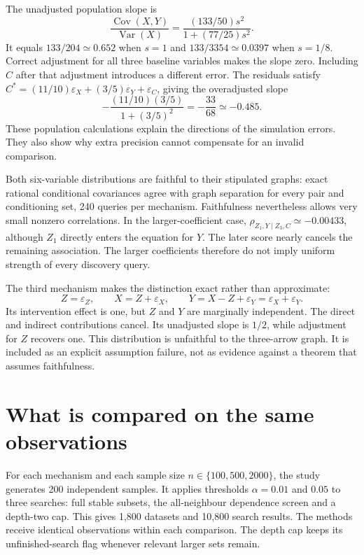 The unadjusted population slope is
\begin{equation}
 \frac{\operatorname{Cov}(X,Y)}{\operatorname{Var}(X)}
 =\frac{(133/50)s^2}{1+(77/25)s^2}.
 \label{closure30:omitted-slope}
\end{equation}
It equals $133/204\simeq0.652$ when $s=1$ and
$133/3354\simeq0.0397$ when $s=1/8$. Correct adjustment for all three baseline
variables makes the slope zero. Including $C$ after that adjustment introduces
a different error. The residuals satisfy
$C^*=(11/10)\varepsilon_X+(3/5)\varepsilon_Y+\varepsilon_C$, giving the
overadjusted slope
\begin{equation}
 -\frac{(11/10)(3/5)}{1+(3/5)^2}=-\frac{33}{68}\simeq-0.485.
 \label{closure30:later-slope}
\end{equation}
These population calculations explain the directions of the simulation errors.
They also show why extra precision cannot compensate for an invalid comparison.

Both six-variable distributions are faithful to their stipulated graphs:
exact rational conditional covariances agree with graph separation for every
pair and conditioning set, 240 queries per mechanism. Faithfulness nevertheless
allows very small nonzero correlations. In the larger-coefficient case,
$\rho_{Z_1,Y\mid Z_3,C}\simeq-0.00433$, although $Z_1$ directly enters the
equation for $Y$. The later score nearly cancels the remaining association.
The larger coefficients therefore do not imply uniform strength of every
discovery query.

The third mechanism makes the distinction exact rather than approximate:
\begin{equation}
 Z=\varepsilon_Z,\qquad X=Z+\varepsilon_X,\qquad
 Y=X-Z+\varepsilon_Y=\varepsilon_X+\varepsilon_Y.
 \label{closure30:cancellation}
\end{equation}
Its intervention effect is one, but $Z$ and $Y$ are marginally independent.
The direct and indirect contributions cancel. Its unadjusted slope is $1/2$,
while adjustment for $Z$ recovers one. This distribution is unfaithful to the
three-arrow graph. It is included as an explicit assumption failure, not as
evidence against a theorem that assumes faithfulness.

\section{What is compared on the same observations}

For each mechanism and each sample size $n\in\{100,500,2000\}$, the study
generates 200 independent samples. It applies thresholds $\alpha=0.01$ and
$0.05$ to three searches: full stable subsets, the all-neighbour dependence
screen and a depth-two cap. This gives 1,800 datasets and 10,800 search results.
The methods receive identical observations within each comparison. The depth
cap keeps its unfinished-search flag whenever relevant larger sets remain.

